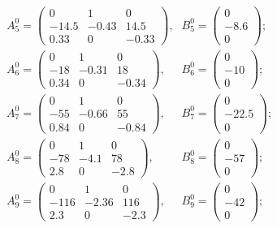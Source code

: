 \begin{equation*}
\begin{array}{lr}
A_5^0 = \left(\begin{array}{ccc}
0     &     1     &     0 \\
-14.5    &     -0.43   &     14.5 \\
0.33  &     0     &     -0.33
\end{array}\right)\mbox{,} &
B_5^0 = \left(\begin{array}{c}
0 \\
-8.6 \\
0
\end{array}\right)\mbox{;} \\
A_6^0 = \left(\begin{array}{ccc}
0     &     1     &     0 \\
-18    &     -0.31   &     18 \\
0.34  &     0     &     -0.34
\end{array}\right)\mbox{,} &
B_6^0 = \left(\begin{array}{c}
0 \\
-10 \\
0
\end{array}\right)\mbox{;} \\
A_7^0 = \left(\begin{array}{ccc}
0     &     1     &     0 \\
-55    &     -0.66   &     55 \\
0.84  &     0     &     -0.84
\end{array}\right)\mbox{,} &
B_7^0 = \left(\begin{array}{c}
0 \\
-22.5 \\
0
\end{array}\right)\mbox{;} \\
A_8^0 = \left(\begin{array}{ccc}
0     &     1     &     0 \\
-78    &     -4.1   &     78 \\
2.8  &     0     &     -2.8
\end{array}\right)\mbox{,} &
B_8^0 = \left(\begin{array}{c}
0 \\
-57 \\
0
\end{array}\right)\mbox{;} \\
A_9^0 = \left(\begin{array}{ccc}
0     &     1     &     0 \\
-116    &     -2.36   &     116 \\
2.3  &     0     &     -2.3
\end{array}\right)\mbox{,} &
B_9^0 = \left(\begin{array}{c}
0 \\
-42 \\
0
\end{array}\right)\mbox{;} \\



\end{array}
\end{equation*}
